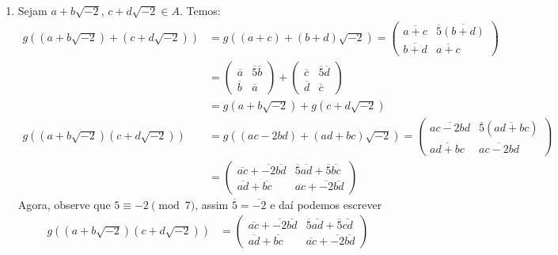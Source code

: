 \documentclass[12pt]{exam}
\begin{document}
    \solucao
    \begin{enumerate}[label=({\alph*})]
        \item Sejam $a + b\sqrt{-2}$, $c + d\sqrt{-2} \in A$. Temos:
        \begin{align*}
            g((a + b\sqrt{-2}) + (c + d\sqrt{-2})) &= g((a + c) + (b + d)\sqrt{-2}) = \begin{pmatrix}
                \overline{a + c} & \overline{5}\overline{(b + d)}\\\overline{b + d} & \overline{a + c}
            \end{pmatrix}\\ &= \begin{pmatrix}
            \overline{a} & \overline{5}\overline{b}\\\overline{b} & \overline{a}
            \end{pmatrix} + \begin{pmatrix}
            \overline{c} & \overline{5}\overline{d}\\\overline{d} & \overline{c}
            \end{pmatrix} \\ &= g(a + b\sqrt{-2}) + g(c + d\sqrt{-2})\\
            g((a + b\sqrt{-2})(c + d\sqrt{-2})) &= g((ac - 2bd) + (ad + bc)\sqrt{-2}) = \begin{pmatrix}
                \overline{ac - 2bd} & \overline{5}(\overline{ad + bc})\\\overline{ad + bc} & \overline{ac - 2bd}
            \end{pmatrix} \\ &= \begin{pmatrix}
            \overline{ac} + \overline{-2}\overline{bd} & \overline{5}\overline{ad} + \overline{5}\overline{bc}\\\overline{ad} + \overline{bc} & \overline{ac} + \overline{-2}\overline{bd}
            \end{pmatrix}
        \end{align*}
        Agora, observe que $5 \equiv -2 \pmod 7$, assim $\overline{5} = \overline{-2}$ e daí podemos escrever
        \begin{align*}
            g((a + b\sqrt{-2})(c + d\sqrt{-2})) &= \begin{pmatrix}
                \overline{ac} + \overline{-2}\overline{bd} & \overline{5}\overline{ad} + \overline{5}\overline{cd}\\\overline{ad} + \overline{bc} & \overline{ac} + \overline{-2}\overline{bd}

\end{pmatrix}
\end{align*}
\end{enumerate}
\end{document}
